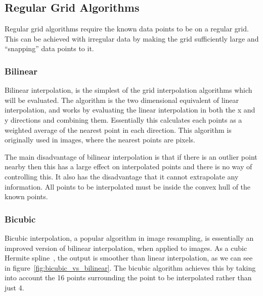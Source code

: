     \subsection{Regular Grid Algorithms}\label{background_interpolation_methods_regulargrid}

        Regular grid algorithms require the known data points to be on a regular grid. This can be achieved with irregular data by making the grid sufficiently large and ``snapping'' data points to it.

        \subsubsection{Bilinear}\label{background_interpolation_methods_bilinear}

            Bilinear interpolation, is the simplest of the grid interpolation algorithms which will be evaluated. The algorithm is the two dimensional equivalent of linear interpolation, and works by evaluating the linear interpolation in both the x and y directions and combining them. Essentially this calculates each points as a weighted average of the nearest point in each direction. This algorithm is originally used in images, where the nearest points are pixels. 

            The main disadvantage of bilinear interpolation is that if there is an outlier point nearby then this has a large effect on interpolated points and there is no way of controlling this. It also has the disadvantage that it cannot extrapolate any information. All points to be interpolated must be inside the convex hull of the known points.


        \subsubsection{Bicubic}\label{background_interpolation_methods_bicubic}

            Bicubic interpolation, a popular algorithm in image resampling, is essentially an improved version of bilinear interpolation, when applied to images. As a cubic Hermite spline~\cite{practicalguidesplines}, the output is smoother than linear interpolation, as we can see in figure~\ref{fig:bicubic_vs_bilinear}. The bicubic algorithm achieves this by taking into account the 16 points surrounding the point to be interpolated rather than just 4. 


